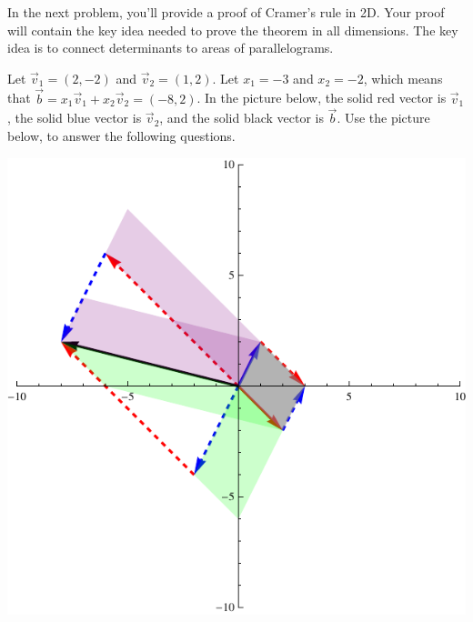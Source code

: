 In the next problem, you'll provide a proof of Cramer's rule in 2D. Your proof will contain the key idea needed to prove the theorem in all dimensions. The key idea is to connect determinants to areas of parallelograms.  
\begin{problem}
Let $\vec v_1 = (2,-2)$ and $\vec v_2 = (1,2)$. Let $x_1=-3$ and $x_2 = -2$, which means that $\vec b = x_1\vec v_1+x_2\vec v_2=(-8,2)$. In the picture below, the solid red vector is $\vec v_1$, the solid blue vector is $\vec v_2$, and the solid black vector is $\vec b$. Use the picture below, to answer the following questions.

\includegraphics{cramers-visual}


\end{problem}
